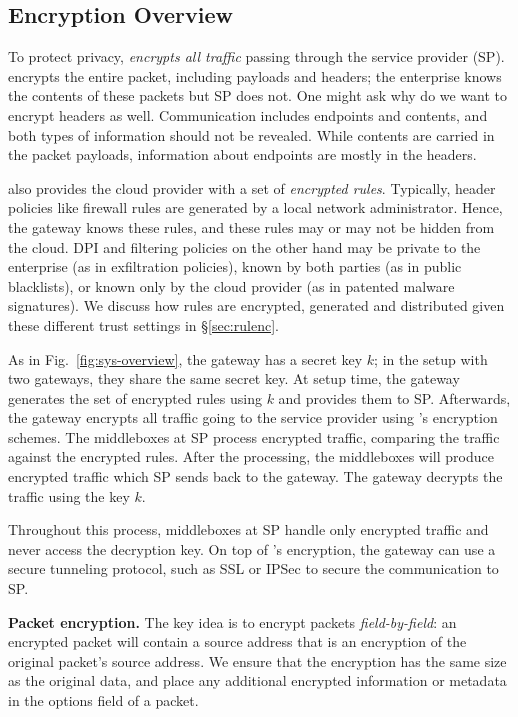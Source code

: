 \subsection{Encryption Overview}



To protect privacy, \sys \textit{encrypts all traffic} passing through the service provider (SP).
\sys encrypts the entire packet, including payloads and headers; the enterprise knows the contents of these packets but SP does not. One might ask why do we want to encrypt headers as well. Communication includes endpoints and contents, and both types of information should not be revealed. While contents are carried in the packet payloads, information about endpoints are mostly in the headers. 

\sys also provides the cloud provider with a set of {\it encrypted rules}.
Typically, header policies like firewall rules are generated by a local network administrator. Hence, the gateway knows these rules, and these rules may or may not be hidden from the cloud.
DPI and filtering policies on the other hand may be private to the enterprise (as in exfiltration policies), known by both parties (as in  public blacklists), or known only by the cloud provider (as in  patented malware signatures).
We discuss how rules are encrypted, generated and distributed given these different trust settings in \S\ref{sec:rulenc}.

As in Fig.~\ref{fig:sys-overview}, the gateway has a secret key $k$; in the setup with two gateways, they share
the same secret key. 
At setup time, the gateway generates the set of encrypted rules using $k$ and provides them to SP.
Afterwards, the gateway encrypts all traffic going to the service provider using \sys's encryption schemes.
The middleboxes at SP process  encrypted traffic, comparing the traffic against the encrypted rules. 
After the processing, the middleboxes
will produce encrypted traffic which SP sends back to the gateway. The gateway decrypts the traffic using the key $k$.

Throughout this process, middleboxes at SP handle only encrypted traffic and never access the decryption key. 
On top of \sys's encryption, the gateway can use a secure tunneling protocol, such as SSL or IPSec to secure the communication to SP.




\noindent\textbf{Packet encryption.}
The key idea is to encrypt packets {\it field-by-field}: \eg{}  an encrypted packet will contain a source address that is an encryption of the original packet's source address. We ensure that the encryption has the same size as the original data, and place any additional encrypted information or metadata in the options field of a packet. 

